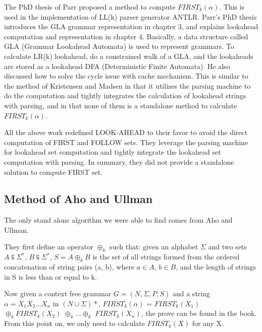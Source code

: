 \documentclass{sig-alternate-05-2015}
\begin{document}
The PhD thesis of Parr \cite{parr93ll} proposed a method to compute
$FIRST_k(\alpha)$. This is used in the implementation of LL(k)
parser generator ANTLR. Parr's PhD thesis introduces the
GLA grammar representation in chapter 3, and explains
lookahead computation and representation in chapter 4.
Basically, a data structure called GLA (Grammar
Lookahead Automata) is used to represent grammars. To
calculate LR(k) lookahead, do a constrained walk of a
GLA, and the lookaheads are stored as a lookahead DFA
(Deterministic Finite Automata). He also discussed how to
solve the cycle issue with cache mechanism.
This is similar to the method of Kristensen and Madsen
in that it utilizes the parsing machine to do the computation
and tightly integrates the calculation of lookahead strings
with parsing, and in that none of them is a standalone
method to calculate $FIRST_k(\alpha)$.

All the above work redefined LOOK-AHEAD to their favor to avoid the direct computation of FIRST and FOLLOW sets. 
They leverage the parsing machine for lookahead set computation and tightly integrate the lookahead set computation with parsing. 
In summary, they did not provide a standalone solution to compute FIRST set.

\subsection{Method of Aho and Ullman}
The only stand alone algorithm we were able to find comes from
Aho and Ullman\cite{aho72parsing}. 

They first define an operator $\oplus_k$ such that: given an alphabet $\Sigma$ and
two sets $A \subseteqq \Sigma^*$, $B \subseteqq \Sigma^*$, $S = A \oplus_k B$ 
is the set of all
strings formed from the ordered concatenation of string
pairs (a, b), where $a \in A$, $b \in B$, and the length of strings in
S is less than or equal to k.

Now given a context free grammar $G = (N, \Sigma, P, S)$ and
a string $ \alpha = X_1X_2…X_n$ in $(N \cup \Sigma)*$, 
$FIRST_k(\alpha)$ =
$FIRST_k(X_1)$ $\oplus_k FIRST_k(X_2)$ $\oplus_k \ldots \oplus_k$ $FIRST_k(X_n)$, the prove can be found in the book.
From this point on, we only need to calculate $FIRST_k(X)$ for any X.
\end{document}
